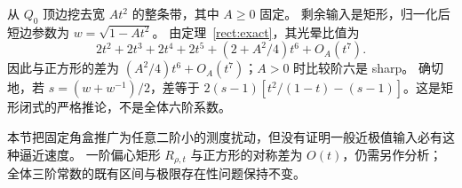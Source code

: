 \begin{example}[整边薄层的六阶效应]\label{ns:strip}
从 $Q_0$ 顶边挖去宽 $At^2$ 的整条带，其中 $A\ge0$ 固定。
剩余输入是矩形，归一化后短边参数为 $w=\sqrt{1-At^2}$。
由定理~\ref{rect:exact}，其光晕比值为
\[
 2t^2+2t^3+2t^4+2t^5+(2+A^2/4)t^6+O_A(t^7).
\]
因此与正方形的差为 $(A^2/4)t^6+O_A(t^7)$；$A>0$ 时比较阶六是 sharp。
确切地，若 $s=(w+w^{-1})/2$，差等于
$2(s-1)[t^2/(1-t)-(s-1)]$。这是矩形闭式的严格推论，不是全体六阶系数。
\end{example}

本节把固定角盒推广为任意二阶小的测度扰动，但没有证明一般近极值输入必有这种逼近速度。
一阶偏心矩形 $R_{\rho,t}$ 与正方形的对称差为 $O(t)$，仍需另作分析；
全体三阶常数的既有区间与极限存在性问题保持不变。
